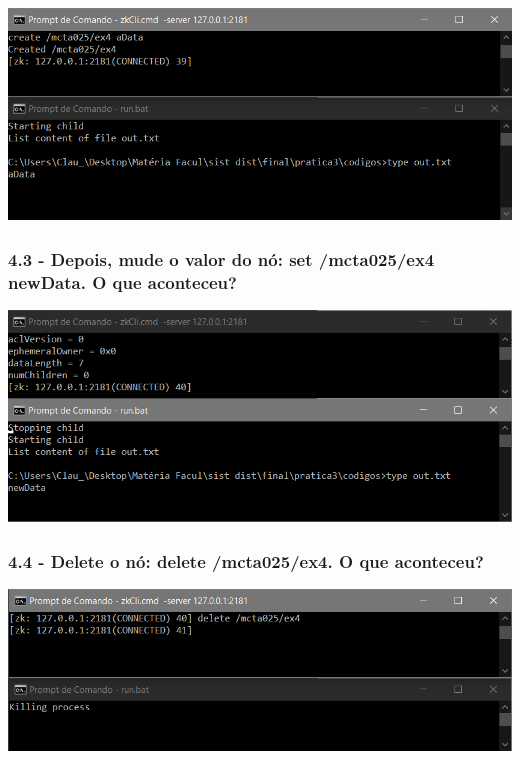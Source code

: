\includegraphics{pratica3/prints/roteiro 4.2.PNG}

\subsubsection{4.3 - Depois, mude o valor do nó: set /mcta025/ex4 newData. O que
aconteceu?}
\includegraphics{pratica3/prints/roteiro 4.3.PNG}

\subsubsection{4.4 - Delete o nó: delete /mcta025/ex4. O que aconteceu?}
\includegraphics{pratica3/prints/roteiro 4.4.PNG}
